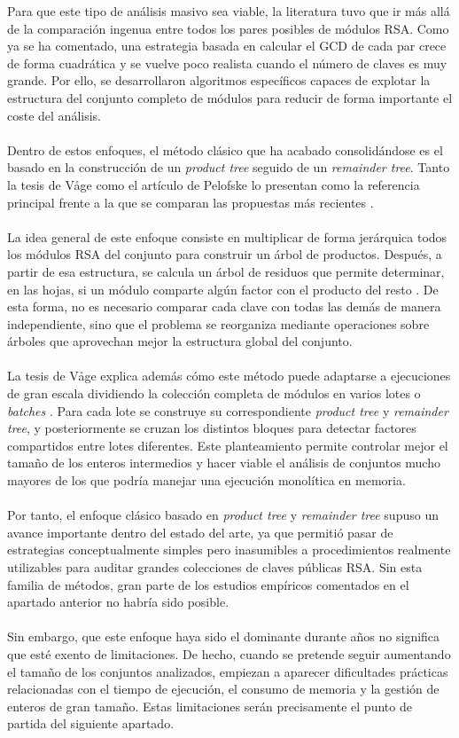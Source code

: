 Para que este tipo de análisis masivo sea viable, la literatura tuvo que ir más allá de la comparación ingenua entre todos los pares posibles de módulos RSA. Como ya se ha comentado, una estrategia basada en calcular el GCD de cada par crece de forma cuadrática y se vuelve poco realista cuando el número de claves es muy grande. Por ello, se desarrollaron algoritmos específicos capaces de explotar la estructura del conjunto completo de módulos para reducir de forma importante el coste del análisis.
\\
\\
Dentro de estos enfoques, el método clásico que ha acabado consolidándose es el basado en la construcción de un \textit{product tree} seguido de un \textit{remainder tree}. Tanto la tesis de Våge como el artículo de Pelofske lo presentan como la referencia principal frente a la que se comparan las propuestas más recientes \cite{vage2022finding,pelofske2024efficient}.
\\
\\
La idea general de este enfoque consiste en multiplicar de forma jerárquica todos los módulos RSA del conjunto para construir un árbol de productos. Después, a partir de esa estructura, se calcula un árbol de residuos que permite determinar, en las hojas, si un módulo comparte algún factor con el producto del resto \cite{pelofske2024efficient}. De esta forma, no es necesario comparar cada clave con todas las demás de manera independiente, sino que el problema se reorganiza mediante operaciones sobre árboles que aprovechan mejor la estructura global del conjunto.
\\
\\
La tesis de Våge explica además cómo este método puede adaptarse a ejecuciones de gran escala dividiendo la colección completa de módulos en varios lotes o \textit{batches} \cite{vage2022finding}. Para cada lote se construye su correspondiente \textit{product tree} y \textit{remainder tree}, y posteriormente se cruzan los distintos bloques para detectar factores compartidos entre lotes diferentes. Este planteamiento permite controlar mejor el tamaño de los enteros intermedios y hacer viable el análisis de conjuntos mucho mayores de los que podría manejar una ejecución monolítica en memoria.
\\
\\
Por tanto, el enfoque clásico basado en \textit{product tree} y \textit{remainder tree} supuso un avance importante dentro del estado del arte, ya que permitió pasar de estrategias conceptualmente simples pero inasumibles a procedimientos realmente utilizables para auditar grandes colecciones de claves públicas RSA. Sin esta familia de métodos, gran parte de los estudios empíricos comentados en el apartado anterior no habría sido posible.
\\
\\
Sin embargo, que este enfoque haya sido el dominante durante años no significa que esté exento de limitaciones. De hecho, cuando se pretende seguir aumentando el tamaño de los conjuntos analizados, empiezan a aparecer dificultades prácticas relacionadas con el tiempo de ejecución, el consumo de memoria y la gestión de enteros de gran tamaño. Estas limitaciones serán precisamente el punto de partida del siguiente apartado.

